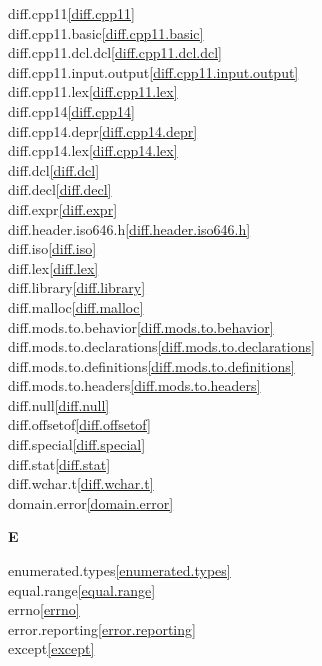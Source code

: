 \begin{multicols}{2}
diff.cpp11\quad\ref{diff.cpp11}\\
diff.cpp11.basic\quad\ref{diff.cpp11.basic}\\
diff.cpp11.dcl.dcl\quad\ref{diff.cpp11.dcl.dcl}\\
diff.cpp11.input.output\quad\ref{diff.cpp11.input.output}\\
diff.cpp11.lex\quad\ref{diff.cpp11.lex}\\
diff.cpp14\quad\ref{diff.cpp14}\\
diff.cpp14.depr\quad\ref{diff.cpp14.depr}\\
diff.cpp14.lex\quad\ref{diff.cpp14.lex}\\
diff.dcl\quad\ref{diff.dcl}\\
diff.decl\quad\ref{diff.decl}\\
diff.expr\quad\ref{diff.expr}\\
diff.header.iso646.h\quad\ref{diff.header.iso646.h}\\
diff.iso\quad\ref{diff.iso}\\
diff.lex\quad\ref{diff.lex}\\
diff.library\quad\ref{diff.library}\\
diff.malloc\quad\ref{diff.malloc}\\
diff.mods.to.behavior\quad\ref{diff.mods.to.behavior}\\
diff.mods.to.declarations\quad\ref{diff.mods.to.declarations}\\
diff.mods.to.definitions\quad\ref{diff.mods.to.definitions}\\
diff.mods.to.headers\quad\ref{diff.mods.to.headers}\\
diff.null\quad\ref{diff.null}\\
diff.offsetof\quad\ref{diff.offsetof}\\
diff.special\quad\ref{diff.special}\\
diff.stat\quad\ref{diff.stat}\\
diff.wchar.t\quad\ref{diff.wchar.t}\\
domain.error\quad\ref{domain.error}\\
\par \textbf{E}\par
enumerated.types\quad\ref{enumerated.types}\\
equal.range\quad\ref{equal.range}\\
errno\quad\ref{errno}\\
error.reporting\quad\ref{error.reporting}\\
except\quad\ref{except}\\

\end{multicols}
